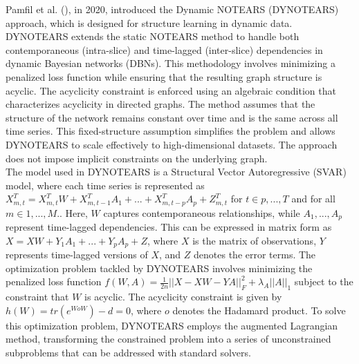 Pamfil et al. (\cite{pamfil2020dynotears}), in 2020, introduced the Dynamic NOTEARS (DYNOTEARS) approach, which is designed for structure learning in dynamic data. DYNOTEARS extends the static NOTEARS method to handle both contemporaneous (intra-slice) and time-lagged (inter-slice) dependencies in dynamic Bayesian networks (DBNs). This methodology involves minimizing a penalized loss function while ensuring that the resulting graph structure is acyclic. The acyclicity constraint is enforced using an algebraic condition that characterizes acyclicity in directed graphs. The method assumes that the structure of the network remains constant over time and is the same across all time series. This fixed-structure assumption simplifies the problem and allows DYNOTEARS to scale effectively to high-dimensional datasets. The approach does not impose implicit constraints on the underlying graph. \cite{hasan2023survey}\\

The model used in DYNOTEARS is a Structural Vector Autoregressive (SVAR) model, where each time series is represented as $X^T_{m,t} = X^T_{m,t}W + X^T_{m,t-1}A_1 + ... + X^T_{m,t-p}A_p + Z^T_{m,t}$ for $t \in {p, ..., T}$ and for all $m \in {1, ..., M}$.. Here, $W$ captures contemporaneous relationships, while $A_1, ..., A_p$ represent time-lagged dependencies. This can be expressed in matrix form as $X = XW + Y_1A_1 + ... + Y_pA_p + Z$, where $X$ is the matrix of observations, $Y$ represents time-lagged versions of $X$, and $Z$ denotes the error terms. The optimization problem tackled by DYNOTEARS involves minimizing the penalized loss function $f(W,A) = \frac{1}{2n}||X - XW - YA||^2_F + \lambda_A||A||_1$ subject to the constraint that $W$ is acyclic. The acyclicity constraint is given by $h(W) = tr(e^{WoW}) - d = 0$, where $o$ denotes the Hadamard product. To solve this optimization problem, DYNOTEARS employs the augmented Lagrangian method, transforming the constrained problem into a series of unconstrained subproblems that can be addressed with standard solvers.\\


